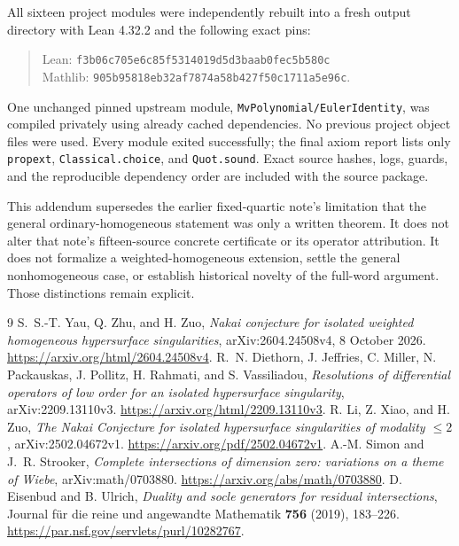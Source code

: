 \documentclass[11pt,letterpaper]{article}
\begin{document}
All sixteen project modules were independently rebuilt into a fresh output
directory with Lean 4.32.2 and the following exact pins:
\begin{quote}\small
Lean: \texttt{f3b06c705e6c85f5314019d5d3baab0fec5b580c}\\
Mathlib: \texttt{905b95818eb32af7874a58b427f50c1711a5e96c}.
\end{quote}
One unchanged pinned upstream module, \texttt{MvPolynomial/EulerIdentity}, was compiled privately using
already cached dependencies. No previous project object files were used.
Every module exited successfully; the final axiom report lists only
\texttt{propext}, \texttt{Classical.choice}, and \texttt{Quot.sound}.
Exact source hashes, logs, guards, and the reproducible dependency order are
included with the source package.

This addendum supersedes the earlier fixed-quartic note's limitation that the
general ordinary-homogeneous statement was only a written theorem.
It does not alter that note's fifteen-source concrete certificate or its
operator attribution. It does not formalize a weighted-homogeneous extension,
settle the general nonhomogeneous case, or establish historical novelty of the
full-word argument. Those distinctions remain explicit.

\begin{thebibliography}{9}
S.~S.-T. Yau, Q. Zhu, and H. Zuo,
\emph{Nakai conjecture for isolated weighted homogeneous hypersurface singularities},
arXiv:2604.24508v4, 8 October 2026.
\url{https://arxiv.org/html/2604.24508v4}.
R.~N. Diethorn, J. Jeffries, C. Miller, N. Packauskas, J. Pollitz,
H. Rahmati, and S. Vassiliadou,
\emph{Resolutions of differential operators of low order for an isolated hypersurface singularity},
arXiv:2209.13110v3.
\url{https://arxiv.org/html/2209.13110v3}.
R. Li, Z. Xiao, and H. Zuo,
\emph{The Nakai Conjecture for isolated hypersurface singularities of modality $\le2$},
arXiv:2502.04672v1.
\url{https://arxiv.org/pdf/2502.04672v1}.
A.-M. Simon and J.~R. Strooker,
\emph{Complete intersections of dimension zero: variations on a theme of Wiebe},
arXiv:math/0703880.
\url{https://arxiv.org/abs/math/0703880}.
D. Eisenbud and B. Ulrich,
\emph{Duality and socle generators for residual intersections},
Journal f\"ur die reine und angewandte Mathematik \textbf{756} (2019), 183--226.
\url{https://par.nsf.gov/servlets/purl/10282767}.
\end{thebibliography}
\end{document}
